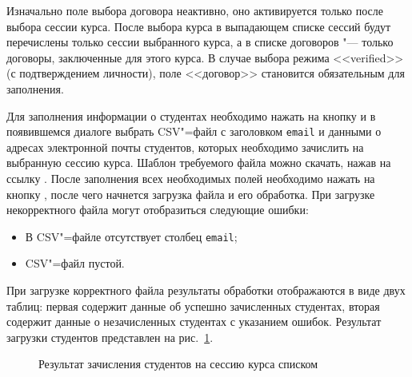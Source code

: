 Изначально поле выбора договора неактивно, оно активируется только после выбора сессии курса.
После выбора курса в выпадающем списке сессий будут перечислены только сессии выбранного курса, 
а в списке договоров "--- только договоры, заключенные для этого курса.
В случае выбора режима <<verified>> (с подтверждением личности), поле <<договор>> становится обязательным для заполнения. 


Для заполнения информации о студентах необходимо нажать на кнопку  и в появившемся диалоге выбрать CSV"=файл 
с заголовком {\tt email} и данными о адресах электронной почты студентов, которых необходимо зачислить на выбранную сессию курса. 
Шаблон требуемого файла можно скачать, нажав на ссылку .
После заполнения всех необходимых полей необходимо нажать на кнопку , 
после чего начнется загрузка файла и его обработка. 
При загрузке некорректного файла могут отобразиться следующие ошибки:
\begin{itemize}
	\item В CSV"=файле отсутствует столбец {\tt email};
	\item CSV"=файл пустой.
\end{itemize} 

При загрузке корректного файла результаты обработки отображаются в виде двух таблиц: 
первая содержит данные об успешно зачисленных студентах, 
вторая содержит данные о незачисленных студентах с указанием ошибок. 
Результат загрузки студентов представлен на рис.~\ref{img:student:mass_enroll_result}.

\begin{figure}[H]
	\caption{Результат зачисления студентов на сессию курса списком}
	\label{img:student:mass_enroll_result}
\end{figure}


